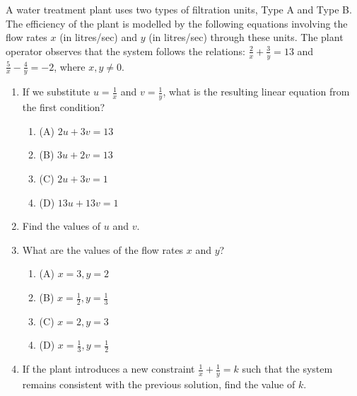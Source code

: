 \documentclass[12pt,a4paper]{exam}
\begin{document}
\begin{questions}
\question[4] A water treatment plant uses two types of filtration units, Type A and Type B. The efficiency of the plant is modelled by the following equations involving the flow rates $x$ (in litres/sec) and $y$ (in litres/sec) through these units. The plant operator observes that the system follows the relations: $\frac{2}{x} + \frac{3}{y} = 13$ and $\frac{5}{x} - \frac{4}{y} = -2$, where $x, y \neq 0$.
\vspace{0.2cm}
\begin{enumerate}[label=(\roman*)]
  \item If we substitute $u = \frac{1}{x}$ and $v = \frac{1}{y}$, what is the resulting linear equation from the first condition?
  \begin{enumerate}[label=(\Alph*)]
    \item (A) $2u + 3v = 13$
    \item (B) $3u + 2v = 13$
    \item (C) $2u + 3v = 1$
    \item (D) $13u + 13v = 1$
  \end{enumerate}
  \item Find the values of $u$ and $v$.
  \item What are the values of the flow rates $x$ and $y$?
  \begin{enumerate}[label=(\Alph*)]
    \item (A) $x = 3, y = 2$
    \item (B) $x = \frac{1}{2}, y = \frac{1}{3}$
    \item (C) $x = 2, y = 3$
    \item (D) $x = \frac{1}{3}, y = \frac{1}{2}$
  \end{enumerate}
  \item If the plant introduces a new constraint $\frac{1}{x} + \frac{1}{y} = k$ such that the system remains consistent with the previous solution, find the value of $k$.
\end{enumerate}
\vspace{0.15cm}

\end{questions}
\bigskip
\end{document}
